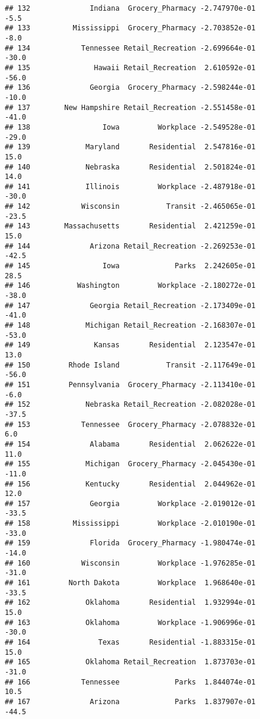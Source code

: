 \documentclass[]{article}
\begin{document}
\begin{verbatim}
## 132              Indiana  Grocery_Pharmacy -2.747970e-01          -5.5
## 133          Mississippi  Grocery_Pharmacy -2.703852e-01          -8.0
## 134            Tennessee Retail_Recreation -2.699664e-01         -30.0
## 135               Hawaii Retail_Recreation  2.610592e-01         -56.0
## 136              Georgia  Grocery_Pharmacy -2.598244e-01         -10.0
## 137        New Hampshire Retail_Recreation -2.551458e-01         -41.0
## 138                 Iowa         Workplace -2.549528e-01         -29.0
## 139             Maryland       Residential  2.547816e-01          15.0
## 140             Nebraska       Residential  2.501824e-01          14.0
## 141             Illinois         Workplace -2.487918e-01         -30.0
## 142            Wisconsin           Transit -2.465065e-01         -23.5
## 143        Massachusetts       Residential  2.421259e-01          15.0
## 144              Arizona Retail_Recreation -2.269253e-01         -42.5
## 145                 Iowa             Parks  2.242605e-01          28.5
## 146           Washington         Workplace -2.180272e-01         -38.0
## 147              Georgia Retail_Recreation -2.173409e-01         -41.0
## 148             Michigan Retail_Recreation -2.168307e-01         -53.0
## 149               Kansas       Residential  2.123547e-01          13.0
## 150         Rhode Island           Transit -2.117649e-01         -56.0
## 151         Pennsylvania  Grocery_Pharmacy -2.113410e-01          -6.0
## 152             Nebraska Retail_Recreation -2.082028e-01         -37.5
## 153            Tennessee  Grocery_Pharmacy -2.078832e-01           6.0
## 154              Alabama       Residential  2.062622e-01          11.0
## 155             Michigan  Grocery_Pharmacy -2.045430e-01         -11.0
## 156             Kentucky       Residential  2.044962e-01          12.0
## 157              Georgia         Workplace -2.019012e-01         -33.5
## 158          Mississippi         Workplace -2.010190e-01         -33.0
## 159              Florida  Grocery_Pharmacy -1.980474e-01         -14.0
## 160            Wisconsin         Workplace -1.976285e-01         -31.0
## 161         North Dakota         Workplace  1.968640e-01         -33.5
## 162             Oklahoma       Residential  1.932994e-01          15.0
## 163             Oklahoma         Workplace -1.906996e-01         -30.0
## 164                Texas       Residential -1.883315e-01          15.0
## 165             Oklahoma Retail_Recreation  1.873703e-01         -31.0
## 166            Tennessee             Parks  1.844074e-01          10.5
## 167              Arizona             Parks  1.837907e-01         -44.5

\end{verbatim}
\end{document}
